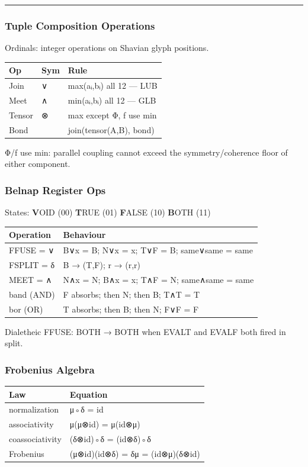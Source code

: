 \documentclass[12pt,a4paper]{article}
\begin{document}
\begin{center}\rule{0.5\linewidth}{0.5pt}\end{center}

\hypertarget{tuple-composition-operations}{%
\subsubsection{Tuple Composition
Operations}\label{tuple-composition-operations}}

Ordinals: integer operations on Shavian glyph positions.

\begin{longtable}[]{@{}lll@{}}
\toprule
Op & Sym & Rule\tabularnewline
\midrule
\endhead
Join & ∨ & max(aᵢ,bᵢ) all 12 --- LUB\tabularnewline
Meet & ∧ & min(aᵢ,bᵢ) all 12 --- GLB\tabularnewline
Tensor & ⊗ & max except Φ, ƒ use min\tabularnewline
Bond & & join(tensor(A,B), bond)\tabularnewline
\bottomrule
\end{longtable}

Φ/ƒ use min: parallel coupling cannot exceed the symmetry/coherence
floor of either component.

\hypertarget{belnap-register-ops}{%
\subsubsection{Belnap Register Ops}\label{belnap-register-ops}}

States: \textbf{V}OID (00) \textbf{T}RUE (01) \textbf{F}ALSE (10)
\textbf{B}OTH (11)

\begin{longtable}[]{@{}ll@{}}
\toprule
Operation & Behaviour\tabularnewline
\midrule
\endhead
FFUSE = ∨ & B∨x = B; N∨x = x; T∨F = B; same∨same = same\tabularnewline
FSPLIT = δ & B → (T,F); r → (r,r)\tabularnewline
MEET = ∧ & N∧x = N; B∧x = x; T∧F = N; same∧same = same\tabularnewline
band (AND) & F absorbs; then N; then B; T∧T = T\tabularnewline
bor (OR) & T absorbs; then B; then N; F∨F = F\tabularnewline
\bottomrule
\end{longtable}

Dialetheic FFUSE: BOTH → BOTH when EVALT and EVALF both fired in split.

\hypertarget{frobenius-algebra}{%
\subsubsection{Frobenius Algebra}\label{frobenius-algebra}}

\begin{longtable}[]{@{}ll@{}}
\toprule
Law & Equation\tabularnewline
\midrule
\endhead
normalization & μ◦δ = id\tabularnewline
associativity & μ(μ⊗id) = μ(id⊗μ)\tabularnewline
coassociativity & (δ⊗id)◦δ = (id⊗δ)◦δ\tabularnewline
Frobenius & (μ⊗id)(id⊗δ) = δμ = (id⊗μ)(δ⊗id)\tabularnewline
\bottomrule
\end{longtable}
\end{document}

